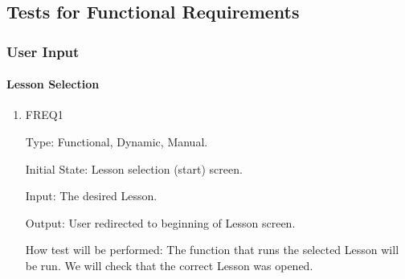 \documentclass[12pt, titlepage]{article}
\begin{document}
\subsection{Tests for Functional Requirements}

\subsubsection{User Input}
		
\paragraph{Lesson Selection}

\begin{enumerate}

\item{FREQ1\\}

Type: Functional, Dynamic, Manual.
					
Initial State: Lesson selection (start) screen.
					
Input: The desired Lesson.
					
Output: User redirected to beginning of Lesson screen.
					
How test will be performed: The function that runs the selected Lesson will be run. We will check that the correct Lesson was opened.

\end{enumerate}
\end{document}
